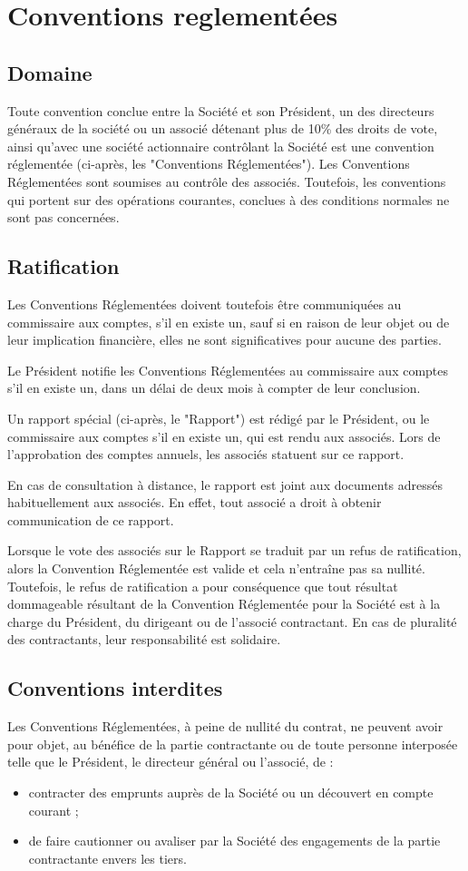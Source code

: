\documentclass[a4paper,12pt]{report}
\begin{document}
\section{Conventions reglementées}
\subsection{Domaine}
Toute convention conclue entre la Société et son Président, un des directeurs généraux de la société ou un associé détenant plus de 10\% des droits de vote, ainsi qu'avec une société actionnaire contrôlant la Société est une convention réglementée (ci-après, les "Conventions Réglementées"). Les Conventions Réglementées sont soumises au contrôle des associés. Toutefois, les conventions qui portent sur des opérations courantes, conclues à des conditions normales ne sont pas concernées.

\subsection{Ratification}
Les Conventions Réglementées doivent toutefois être communiquées au commissaire aux comptes, s'il en existe un, sauf si en raison de leur objet ou de leur implication financière, elles ne sont significatives pour aucune des parties.

Le Président notifie les Conventions Réglementées au commissaire aux comptes s'il en existe un, dans un délai de deux mois à compter de leur conclusion.

Un rapport spécial (ci-après, le "Rapport") est rédigé par le Président, ou le commissaire aux comptes s'il en existe un, qui est rendu aux associés. Lors de l'approbation des comptes annuels, les associés statuent sur ce rapport.

En cas de consultation à distance, le rapport est joint aux documents adressés habituellement aux associés. En effet, tout associé a droit à obtenir communication de ce rapport.

Lorsque le vote des associés sur le Rapport se traduit par un refus de ratification, alors la Convention Réglementée est valide et cela n'entraîne pas sa nullité. Toutefois, le refus de ratification a pour conséquence que tout résultat dommageable résultant de la Convention Réglementée pour la Société est à la charge du Président, du dirigeant ou de l'associé contractant. En cas de pluralité des contractants, leur responsabilité est solidaire.

\subsection{Conventions interdites}
Les Conventions Réglementées, à peine de nullité du contrat, ne peuvent avoir pour objet, au bénéfice de la partie contractante ou de toute personne interposée telle que le Président, le directeur général ou l'associé, de :
\begin{itemize}
	\item contracter des emprunts auprès de la Société ou un découvert en compte courant ;
	\item de faire cautionner ou avaliser par la Société des engagements de la partie contractante envers les tiers.
\end{itemize}
\end{document}
